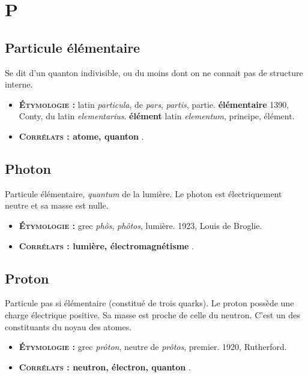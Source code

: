 \chapter{P}
\section{Particule élémentaire}
Se dit d'un quanton indivisible, ou du moins dont on ne connait pas de structure interne.
{\footnotesize
\begin{itemize}[leftmargin=1cm, label=, itemsep=1pt]
\item {\bf \textsc{Étymologie} :} latin {\it particula}, de {\it pars}, {\it partis}, partie.
{\bf élémentaire} 1390, Conty, du latin {\it elementarius}.
{\bf élément} latin {\it elementum}, principe, élément.
\item {\bf \textsc{Corrélats} : atome, quanton} .
\end{itemize}
}

\section{Photon}
Particule élémentaire, {\it quantum} de la lumière.
Le photon est électriquement neutre et sa masse est nulle.
{\footnotesize
\begin{itemize}[leftmargin=1cm, label=, itemsep=1pt]
\item {\bf \textsc{Étymologie} :} grec {\it phôs}, {\it phôtos}, lumière. 1923, Louis de Broglie.
\item {\bf \textsc{Corrélats} : lumière, électromagnétisme} .
\end{itemize}
}

\section{Proton}
Particule pas si élémentaire (constitué de trois quarks).
Le proton possède une charge électrique positive.
Sa masse est proche de celle du neutron.
C'est un des constituants du noyau des atomes.
{\footnotesize
\begin{itemize}[leftmargin=1cm, label=, itemsep=1pt]
\item {\bf \textsc{Étymologie} :} grec {\it prôton}, neutre de {\it prôtos}, premier. 1920, Rutherford.
\item {\bf \textsc{Corrélats} : neutron, électron, quanton} .
\end{itemize}
}
